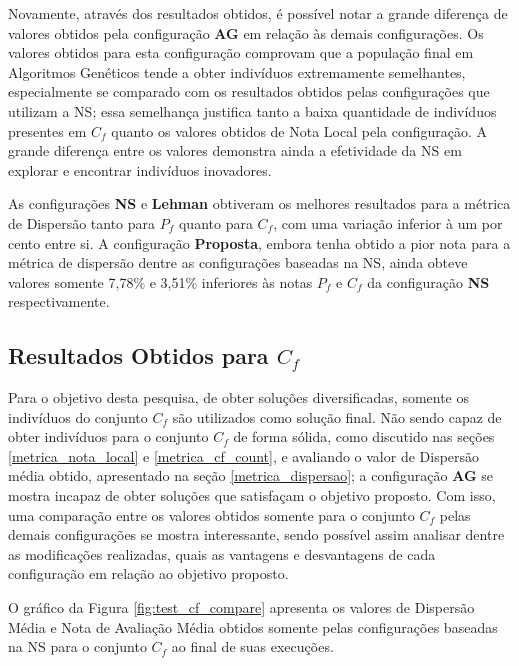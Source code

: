 Novamente, através dos resultados obtidos, é possível notar a grande diferença de valores obtidos pela configuração \textbf{AG} em relação às demais configurações. Os valores obtidos para esta configuração comprovam que a população final em Algoritmos Genéticos tende a obter indivíduos extremamente semelhantes, especialmente se comparado com os resultados obtidos pelas configurações que utilizam a NS; essa semelhança justifica tanto a baixa quantidade de indivíduos presentes em $C_f$ quanto os valores obtidos de Nota Local pela configuração. A grande diferença entre os valores demonstra ainda a efetividade da NS em explorar e encontrar indivíduos inovadores.

As configurações \textbf{NS} e \textbf{Lehman} obtiveram os melhores resultados para a métrica de Dispersão tanto para $P_f$ quanto para $C_f$, com uma variação inferior à um por cento entre si. A configuração \textbf{Proposta}, embora tenha obtido a pior nota para a métrica de dispersão dentre as configurações baseadas na NS, ainda obteve valores somente 7,78\% e 3,51\% inferiores às notas $P_f$ e $C_f$ da configuração \textbf{NS} respectivamente.

\subsection{Resultados Obtidos para \texorpdfstring{$C_f$}{Cf}}
\label{metrica_cf}

Para o objetivo desta pesquisa, de obter soluções diversificadas, somente os indivíduos do conjunto $C_f$ são utilizados como solução final. Não sendo capaz de obter indivíduos para o conjunto $C_f$ de forma sólida, como discutido nas seções \ref{metrica_nota_local} e \ref{metrica_cf_count}, e avaliando o valor de Dispersão média obtido, apresentado na seção \ref{metrica_dispersao}; a configuração \textbf{AG} se mostra incapaz de obter soluções que satisfaçam o objetivo proposto. Com isso, uma comparação entre os valores obtidos somente para o conjunto $C_f$ pelas demais configurações se mostra interessante, sendo possível assim analisar dentre as modificações realizadas, quais as vantagens e desvantagens de cada configuração em relação ao objetivo proposto.

O gráfico da Figura \ref{fig:test_cf_compare} apresenta os valores de Dispersão Média e Nota de Avaliação Média obtidos somente pelas configurações baseadas na NS para o conjunto $C_f$ ao final de suas execuções.

